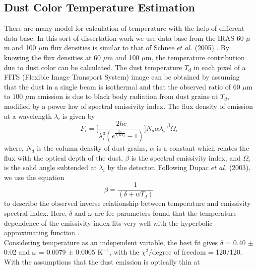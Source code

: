 \documentclass[fleqn,a4paper,12pt,oneside]{article}
\begin{document}
\subsection{Dust Color Temperature Estimation}
There are many model for calculation of temperature with the help
of different data base. In this sort of dissertation work we use
data base from the IRAS 60 $\mu$m and 100 $\mu$m flux densities is
similar to that of Schnee $et$ $al.$ (2005) \cite{36}. By knowing
the flux densities at 60 $\mu$m and 100 $\mu$m, the temperature
contribution due to dust color can be calculated. The dust
temperature $T_{d}$ in each pixel of a FITS (Flexible Image
Transport System) image can be obtained by assuming that the dust
in a single beam is isothermal and that the observed ratio of 60
$\mu$m to 100 $\mu$m emission is due to black body radiation from
dust grains at $T_{d}$, modified by a power law of spectral
emissivity index. The flux density of emission at a wavelength
$\lambda_{i}$ is given by
\begin{equation}\label{3}
F_{i} = \bigg[\frac{2hc}{\lambda^{3}_{i}(e^{\frac{hc}{\lambda_{i}KT_{d}}}-1)}\bigg]N_{d}\alpha\lambda_{i}^{-\beta}\Omega_{i}
\end{equation}
where, $N_{d}$ is the column density of dust grains, $\alpha$ is a
constant which relates the flux with the optical depth of the
dust, $\beta$ is the spectral emissivity index, and $\Omega_{i}$
is the solid angle subtended at $\lambda_{i}$ by the detector.
Following Dupac $et$ $al.$ (2003)\cite{37}, we use the equation
\begin{equation}\label{4}
\beta = \frac{1}{(\delta+wT_{d})}
\end{equation}
to describe the observed inverse relationship between temperature
and emissivity spectral index. Here, $\delta$ and $\omega$ are fee
parameters found that the temperature dependence of the emissivity
index fits very well with the hyperbolic approximating
function \cite{37}.
\\Considering temperature as an independent variable, the best fit gives
$\delta$ = 0.40 $\pm$ 0.02 and $\omega$ = 0.0079 $\pm$ 0.0005 K$^{-1}$, with
the $\chi^{2}/$degree of freedom = 120/120. With the assumptions that the dust emission is optically thin at
\end{document}
